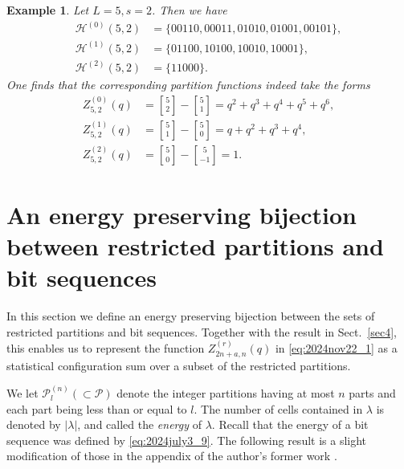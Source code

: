 \documentclass[sn-mathphys-num]{sn-jnl}%
\theoremstyle{thmstyleone}%
\theoremstyle{thmstyletwo}%
\newtheorem{example}{Example}%
\theoremstyle{thmstylethree}%
\begin{document}
\begin{example}
Let $L=5, s=2$.
Then we have
\begin{align*}
\mathcal{H}^{(0)} (5,2) &= \{ 00110, 00011, 01010, 01001, 00101 \}, \\
\mathcal{H}^{(1)} (5,2) &= \{ 01100, 10100, 10010, 10001 \}, \\
\mathcal{H}^{(2)} (5,2) &= \{ 11000 \}. 
\end{align*}
One finds that the corresponding partition functions indeed take the forms
\begin{align*}
Z^{(0)}_{5,2}(q) &={ 5 \brack 2}- { 5 \brack 1}  = q^2 + q^3 + q^4 + q^5 + q^6, \\
Z^{(1)}_{5,2}(q) &={ 5 \brack 1}- { 5 \brack 0}  = q + q^2 + q^3 + q^4, \\
Z^{(2)}_{5,2}(q) &={ 5 \brack 0}- { 5 \brack -1}  = 1. 
\end{align*}


\end{example}


\section{An energy preserving bijection between restricted partitions and bit sequences}\label{sec5}
In this section we define an energy preserving bijection between the sets of restricted partitions 
and bit sequences.
Together with the result in Sect.~\ref{sec4}, this enables us to represent the function
$Z_{2n+a,n}^{(r)}(q)$ in \eqref{eq:2024nov22_1} as a statistical configuration sum over
a subset of the restricted partitions.





We let $\mathscr{P}^{(n)}_l (\subset \mathscr{P})$ denote 
the integer partitions having at most $n$ parts 
and each part being less than or equal to $l$.
The number of cells contained in $\lambda$ is denoted by $|\lambda|$,
and called the {\em energy} of $\lambda$.
Recall that the energy of a bit sequence was defined by \eqref{eq:2024july3_9}.
%
The following result is a slight modification of those in the appendix of
the author's former work \cite{Takagi1}.
\end{document}
